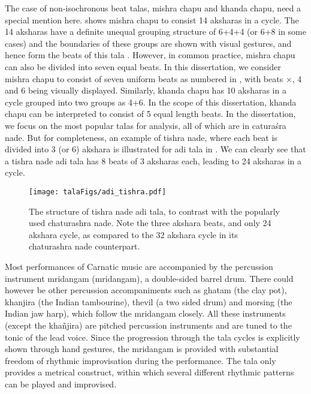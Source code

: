 The case of non-isochronous beat \glspl{tala}, \gls{mishra chapu} and \gls{khanda chapu}, need a special mention here.  shows \gls{mishra chapu} to consist 14 \glspl{akshara} in a cycle. The 14 \glspl{akshara} have a definite unequal grouping structure of 6+4+4 (or 6+8 in some cases) and the boundaries of these groups are shown with visual gestures, and hence form the beats of this \gls{tala} \cite{samba:98:southMusic}. However, in common practice, \gls{mishra chapu} can also be divided into seven equal beats. In this dissertation, we consider \gls{mishra chapu} to consist of seven uniform beats as numbered in , with beats $\times$, 4 and 6 being visually displayed. Similarly, \gls{khanda chapu} has 10 \glspl{akshara} in a cycle grouped into two groups as 4+6. In the scope of this dissertation, \gls{khanda chapu} can be interpreted to consist of 5 equal length beats. In the dissertation, we focus on the most popular \glspl{tala} for analysis, all of which are in caturaśra \gls{nade}. But for completeness, an example of \gls{tishra} \gls{nade}, where each beat is divided into 3 (or 6) \gls{akshara} is illustrated for \gls{adi} \gls{tala} in . We can clearly see that a \gls{tishra} \gls{nade} \gls{adi} \gls{tala} has 8 beats of 3 \glspl{akshara} each, leading to 24 \glspl{akshara} in a cycle. 
\begin{figure}
  \centering
 \texttt{[image: talaFigs/adi\_tishra.pdf]}
\caption[Structure of \gls{tishra} \gls{nade} \gls{adi} \gls{tala}]{The structure of \gls{tishra} \gls{nade} \gls{adi} \gls{tala}, to contrast with the popularly used \gls{chaturashra} \gls{nade}. Note the three \gls{akshara} beats, and only 24 \gls{akshara} cycle, as compared to the 32 \gls{akshara} cycle in its \gls{chaturashra} \gls{nade} counterpart.}\label{fig:taala:aditishra}
\end{figure}

Most performances of Carnatic music are accompanied by the percussion instrument mridangam (\gls{mridangam}), a double-sided barrel drum. There could however be other percussion accompaniments such as \gls{ghatam} (the clay pot), \gls{khanjira} (the Indian tambourine), thevil (a two sided drum) and \gls{morsing} (the Indian jaw harp), which follow the mridangam closely. All these instruments (except the khañjira) are pitched percussion instruments and are tuned to the tonic of the lead voice. Since the progression through the \gls{tala} cycles is explicitly shown through hand gestures, the mridangam is provided with substantial freedom of rhythmic improvisation during the performance. The \gls{tala} only provides a metrical construct, within which several different rhythmic patterns can be played and improvised.

